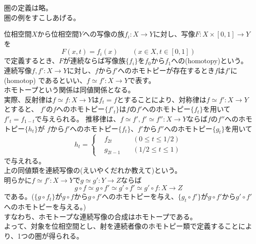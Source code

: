 \documentclass[dvipdfmx,a4paper,11pt]{jsarticle}
\begin{document}
圏の定義は略。\\
圏の例をすこしあげる。
\begin{tcolorbox}[title = 例1]
  位相空間$X$から位相空間$Y$への写像の族$f_{i}:X\to Y$に対し、写像$F:X\times [0,1] \to Y$を
  \begin{equation*}
    F(x,t)=f_{i}(x)\qquad (x\in X,t \in [0,1])
  \end{equation*}
  で定義するとき、$F$が連続ならば写像族$\{f_i\}$を$f_0$から$f_1$への(homotopy)という。\\
  連続写像$f,f':X\to Y$に対し、$f$から$f'$へのホモトピーが存在するとき$f$は$f'$に(homotop)
  であるといい、$f\simeq f':X\to Y$で表す。\\
  ホモトープという関係は同値関係となる。\\
  実際、反射律は$f\simeq f:X\to Y$は$f_{t}=f$とすることにより、対称律は$f\simeq f':X\to Y$とすると、
  $f'$の$f$へのホモトピー$\{f'_{t}\}$は$f$の$f'$へのホモトピー$\{f_{t}\}$を用いて$f'_{t}=f_{1-t}$で与えられる。
  推移律は、$f\simeq f',f'\simeq f'':X\to Y$ならば$f$の$f''$へのホモトピー$\{h_{t}\}$が
  $f$から$f'$へのホモトピー$\{f_{t}\}$、$f'$から$f''$へのホモトピー$\{g_{t}\}$を用いて
  \begin{equation*}
    h_{t}=\left\{ 
    \begin{alignedat}{2}   
      &f_{2t}  \quad &(0\leq t\leq 1/2)\\   
      &g_{2t-1}\quad &(1/2\leq t\leq 1)
    \end{alignedat} 
    \right.
  \end{equation*}
  で与えれる。\\
  上の同値類を連続写像の(えいやくだれか教えて)という。\\
  明らかに$f\simeq f':X\to Y$で$g\simeq g':Y\to Z$ならば\\
  \begin{equation*}
    g\circ f\simeq g\circ f'\simeq g'\circ f'\simeq g'\circ f:X \to Z
  \end{equation*}
  である。($\{g\circ f_{t}\}$が$g\circ f$から$g\circ f'$へのホモトピーを与え、$\{g_{t}\circ f'\}$が$g\circ f'$から$g'\circ f'$へのホモトピーを与える。)\\
  すなわち、ホモトープな連続写像の合成はホモトープである。\\
  よって、対象を位相空間とし、射を連続者像のホモトピー類で定義することにより、1つの圏が得られる。
\end{tcolorbox}

\clearpage
\end{document}
